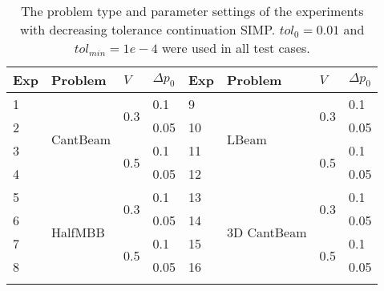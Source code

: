 \begin{table}[H]
\centering
\tabcolsep=0.09cm
\caption{The problem type and parameter settings of the experiments with decreasing tolerance continuation SIMP. $tol_0 = 0.01$ and $tol_{min} = 1e-4$ were used in all test cases.}
\label{tab:exp_params2}
\begin{tabular}{|l|l|l|l||l|l|l|l|}
\hline\noalign{\smallskip}
Exp & Problem & $V$ & $\Delta p_0$ & Exp & Problem & $V$ & $\Delta p_0$ \\
\hline
1 & \multirow{ 4 }{*}{CantBeam} & \multirow{ 2 }{*}{0.3} & 0.1 & 9 & \multirow{ 4 }{*}{LBeam} & \multirow{ 2 }{*}{0.3} & 0.1 \\
2 & & & 0.05 & 10 & & & 0.05 \\
3 & & \multirow{ 2 }{*}{0.5} & 0.1 & 11 & & \multirow{ 2 }{*}{0.5} & 0.1 \\
4 & & & 0.05 & 12 & & & 0.05 \\
\hline
5 & \multirow{ 4 }{*}{HalfMBB} & \multirow{ 2 }{*}{0.3} & 0.1 & 13 & \multirow{ 4 }{*}{3D CantBeam} & \multirow{ 2 }{*}{0.3} & 0.1 \\
6 & & & 0.05 & 14 & & & 0.05 \\
7 & & \multirow{ 2 }{*}{0.5} & 0.1 & 15 & & \multirow{ 2 }{*}{0.5} & 0.1 \\
8 & & & 0.05 & 16 & & & 0.05 \\
\noalign{\smallskip}\hline
\end{tabular}
\end{table}

